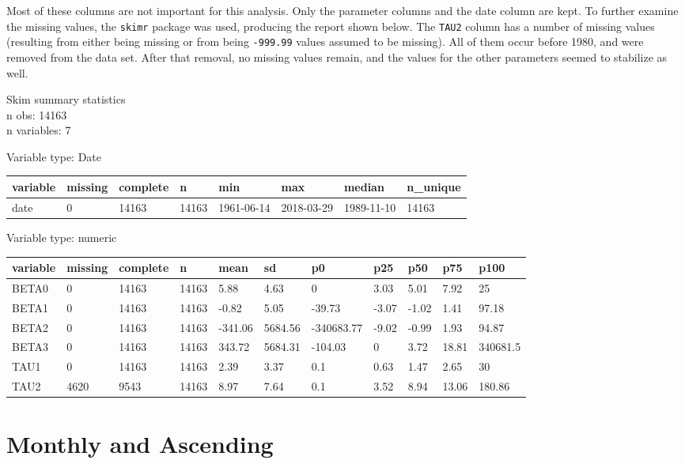 \documentclass[openany]{book}
\theoremstyle{definition}
\theoremstyle{definition}
\theoremstyle{definition}
\theoremstyle{remark}
\begin{document}
\normalsize

Most of these columns are not important for this analysis. Only the
parameter columns and the date column are kept. To further examine the
missing values, the \texttt{skimr} package was used, producing the
report shown below. The \texttt{TAU2} column has a number of missing
values (resulting from either being missing or from being
\texttt{-999.99} values assumed to be missing). All of them occur before
1980, and were removed from the data set. After that removal, no missing
values remain, and the values for the other parameters seemed to
stabilize as well.

\small

Skim summary statistics\\
n obs: 14163\\
n variables: 7

Variable type: Date

\begin{tabular}{llllllll}
\toprule
variable & missing & complete & n & min & max & median & n\_unique\\
\midrule
date & 0 & 14163 & 14163 & 1961-06-14 & 2018-03-29 & 1989-11-10 & 14163\\
\bottomrule
\end{tabular}

Variable type: numeric

\begin{tabular}{lllllllllll}
\toprule
variable & missing & complete & n & mean & sd & p0 & p25 & p50 & p75 & p100\\
\midrule
BETA0 & 0 & 14163 & 14163 & 5.88 & 4.63 & 0 & 3.03 & 5.01 & 7.92 & 25\\
BETA1 & 0 & 14163 & 14163 & -0.82 & 5.05 & -39.73 & -3.07 & -1.02 & 1.41 & 97.18\\
BETA2 & 0 & 14163 & 14163 & -341.06 & 5684.56 & -340683.77 & -9.02 & -0.99 & 1.93 & 94.87\\
BETA3 & 0 & 14163 & 14163 & 343.72 & 5684.31 & -104.03 & 0 & 3.72 & 18.81 & 340681.5\\
TAU1 & 0 & 14163 & 14163 & 2.39 & 3.37 & 0.1 & 0.63 & 1.47 & 2.65 & 30\\
TAU2 & 4620 & 9543 & 14163 & 8.97 & 7.64 & 0.1 & 3.52 & 8.94 & 13.06 & 180.86\\
\bottomrule
\end{tabular}

\normalsize

\hypertarget{monthly}{%
\section{Monthly and Ascending}\label{monthly}}
\end{document}
